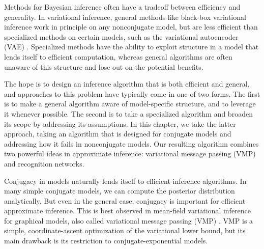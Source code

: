 Methods for Bayesian inference
often have a tradeoff between
efficiency and generality.
In variational inference,
general methods like black-box variational inference \cite{bbvi}
work in principle on any nonconjugate model,
but are less efficient
than specialized methods on certain models,
such as the variational autoencoder (VAE) \cite{vae}. 
Specialized
methods have the ability to
exploit structure in a model
that lends itself to efficient computation,
whereas general algorithms are often
unaware of this structure and lose out on the potential 
benefits.

The hope is to design an inference algorithm
that is both efficient and general,
and approaches to this problem have typically come in one of two forms.
The first is to make a general algorithm
aware of model-specific structure,
and to leverage it whenever possible.
The second is to take a specialized
algorithm and broaden its scope
by addressing its assumptions.
In this chapter, we take the latter approach,
taking an algorithm
that is designed for conjugate models
and addressing how it fails in nonconjugate models.
Our resulting algorithm combines two powerful ideas 
in approximate inference: variational message
passing (VMP)\cite{vmp} and recognition networks.


Conjugacy in models naturally lends itself
to efficient inference algorithms.
In many simple conjugate models,
we can compute the posterior distribution analytically.
But even in the general case, conjugacy is important
for efficient approximate inference.
This is best observed in mean-field variational inference
for graphical models, also called variational message passing (VMP) \cite{vmp}.
VMP is a simple, coordinate-ascent optimization of the
variational lower bound,
but its main drawback is its restriction
to conjugate-exponential models.


